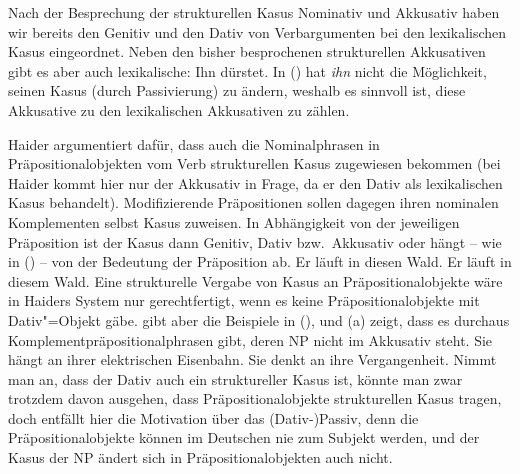 Nach der Besprechung der strukturellen Kasus Nominativ und Akkusativ haben wir bereits den Genitiv und den
Dativ von Verbargumenten bei den lexikalischen Kasus eingeordnet. Neben den bisher besprochenen
strukturellen Akkusativen gibt es aber auch lexikalische:
\ea Ihn dürstet.
\z
In () hat \emph{ihn} nicht die Möglichkeit, seinen Kasus (\zb durch Passivierung) zu ändern,
weshalb es sinnvoll ist, diese Akkusative zu den lexikalischen Akkusativen zu zählen.

%
Haider argumentiert dafür, dass auch die Nominalphrasen
in Präpositionalobjekten vom Verb strukturellen Kasus zugewiesen bekommen
(bei Haider kommt hier nur der Akkusativ in Frage, da er den Dativ als lexikalischen Kasus behandelt).
Modifizierende Präpositionen sollen dagegen ihren nominalen Komplementen selbst Kasus zuweisen.
In Abhängigkeit von der jeweiligen Präposition ist der Kasus dann Genitiv, Dativ bzw.\
Akkusativ oder hängt -- wie in () -- von der Bedeutung der Präposition ab.
\eal
\ex Er läuft in diesen Wald.
\ex Er läuft in diesem Wald.
\zl
Eine strukturelle Vergabe von Kasus an Präpositionalobjekte wäre in Haiders
System nur gerechtfertigt, wenn es keine Präpositionalobjekte mit Dativ"=Objekt gäbe.
\citet[\page 78]{Eisenberg94a} gibt aber die Beispiele in (\mex{1}), und (\mex{1}a) zeigt,
dass es durchaus Komplementpräpositionalphrasen gibt, deren NP nicht im Akkusativ steht.
\eal
\ex Sie hängt an ihrer elektrischen Eisenbahn.
\ex Sie denkt an ihre Vergangenheit.
\zl
Nimmt man an, dass der Dativ auch ein struktureller Kasus ist, könnte man zwar
trotzdem davon ausgehen, dass Präpositionalobjekte strukturellen Kasus tragen, doch
entfällt hier die Motivation über das (Dativ-)Passiv, denn die Präpositionalobjekte
können im Deutschen nie zum Subjekt werden, und der Kasus der NP ändert sich in
Präpositionalobjekten auch nicht.

